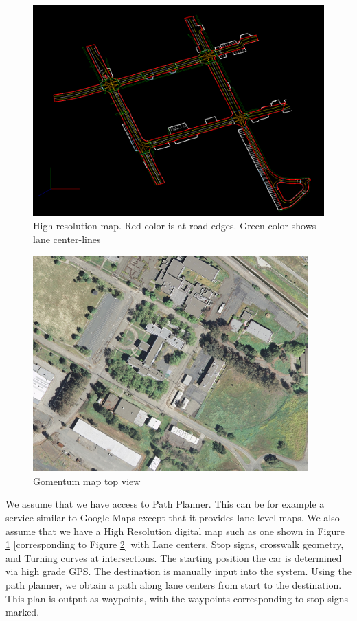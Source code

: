 \documentclass[letterpaper, 10 pt, conference]{ieeeconf}  %
\begin{document}
\begin{figure}[thpb]
  \centering
  \includegraphics[width=1.0\columnwidth]{graphics/zenrin.png}
  \caption{High resolution map. Red color is at road edges. Green color shows lane center-lines}
  \label{fig:map}
\end{figure}

\begin{figure}[thpb]
  \centering
  \includegraphics[width=1.0\columnwidth]{graphics/GoMentumSatelliteSmall.png}
  \caption{Gomentum map top view}
  \label{fig:gomentum}
\end{figure}

We assume that we have access to Path Planner. This can be for example a service similar to
Google Maps except that it provides lane level maps. We also assume that we have a High
Resolution digital map such as one shown in Figure \ref{fig:map} [corresponding to 
Figure \ref{fig:gomentum}] with Lane centers, Stop 
signs, crosswalk geometry, and Turning curves at intersections. The starting position the 
car is determined via high grade GPS. The destination is manually input into the system.
Using the path planner, we obtain a path along lane centers from start to the destination.
This plan is output as waypoints, with the waypoints corresponding to stop signs marked.
\end{document}
